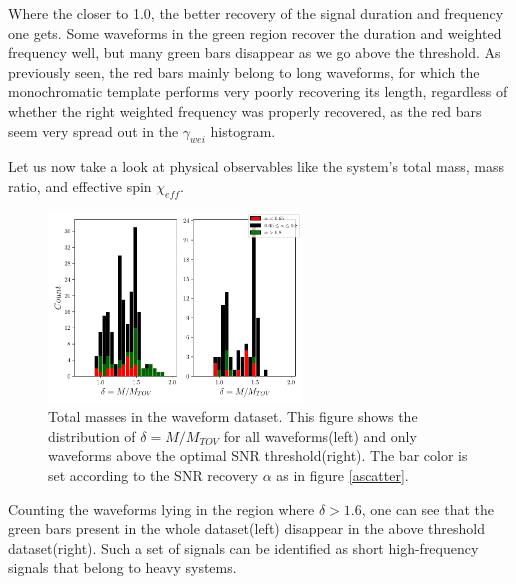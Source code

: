 Where the closer to 1.0, the better recovery of the signal duration and frequency one gets. Some waveforms in the green region recover the duration and weighted frequency well, but many green bars disappear as we go above the threshold. As previously seen, the red bars mainly belong to long waveforms, for which the monochromatic template performs very poorly recovering its length, regardless of whether the right weighted frequency was properly recovered, as the red bars seem very spread out in the $\gamma_{wei}$ histogram. 

\newpage

Let us now take a look at physical observables like the system's total mass, mass ratio, and effective spin $\chi_{eff}$.  

\begin{figure}[hbt!]
\begin{center}
\includegraphics[width=0.6\textwidth, angle=0]{images/Data_analysis/results/alpha_deltahist.pdf}
\captionsetup{width=0.8\textwidth}
\caption[Total masses in the waveform dataset]{Total masses in the waveform dataset. This figure shows the distribution of $\delta=M/M_{TOV}$ for all waveforms(left) and only waveforms above the optimal SNR threshold(right). The bar color is set according to the SNR recovery $\alpha$ as in figure \ref{ascatter}.}
\label{adelhist}
\end{center}
\end{figure}

Counting the waveforms lying in the region where $\delta>1.6$, one can see that the green bars present in the whole dataset(left) disappear in the above threshold dataset(right). Such a set of signals can be identified as short high-frequency signals that belong to heavy systems. 

